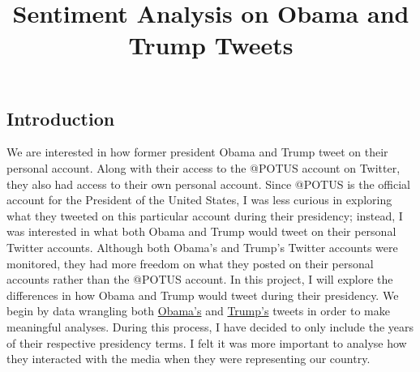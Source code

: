 \documentclass[
  letterpaper,
  DIV=11,
  numbers=noendperiod]{scrartcl}
\title{Sentiment Analysis on Obama and Trump Tweets}
\author{}
\date{}
\begin{document}
\maketitle


\subsection{Introduction}\label{introduction}

We are interested in how former president Obama and Trump tweet on their
personal account. Along with their access to the @POTUS account on
Twitter, they also had access to their own personal account. Since
@POTUS is the official account for the President of the United States, I
was less curious in exploring what they tweeted on this particular
account during their presidency; instead, I was interested in what both
Obama and Trump would tweet on their personal Twitter accounts. Although
both Obama's and Trump's Twitter accounts were monitored, they had more
freedom on what they posted on their personal accounts rather than the
@POTUS account. In this project, I will explore the differences in how
Obama and Trump would tweet during their presidency. We begin by data
wrangling both
\href{https://www.kaggle.com/datasets/neelgajare/all-12000-president-obama-tweets}{Obama's}
and
\href{https://www.kaggle.com/datasets/zusmani/trumps-legacy}{Trump's}
tweets in order to make meaningful analyses. During this process, I have
decided to only include the years of their respective presidency terms.
I felt it was more important to analyse how they interacted with the
media when they were representing our country.
\end{document}
